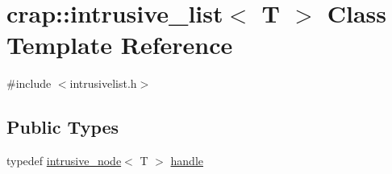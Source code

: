 \hypertarget{singletoncrap_1_1intrusive__list}{\section{crap\+:\+:intrusive\+\_\+list$<$ T $>$ Class Template Reference}
\label{singletoncrap_1_1intrusive__list}
}


{\ttfamily \#include $<$intrusivelist.\+h$>$}

\subsection*{Public Types}
\begin{DoxyCompactItemize}
\item 
typedef \hyperlink{classcrap_1_1intrusive__node}{intrusive\+\_\+node}$<$ T $>$ \hyperlink{singletoncrap_1_1intrusive__list_a34ddb2f1e2fe47098b3227bb6b6e9e58}{handle}
\end{DoxyCompactItemize}
